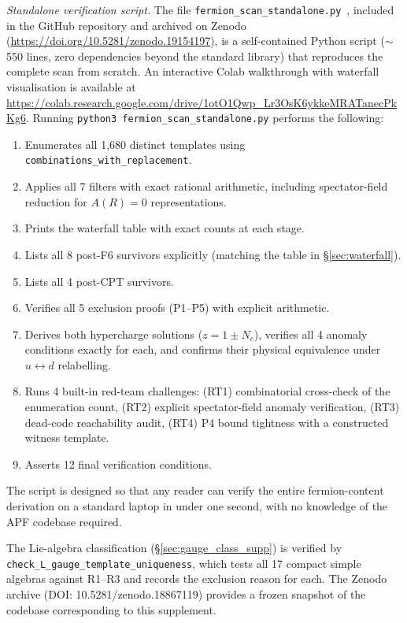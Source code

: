 \documentclass[11pt,a4paper]{article}
\theoremstyle{definition}
\begin{document}
\smallskip\noindent\textit{Standalone verification script.}\quad
The file \texttt{fermion\_scan\_standalone.py}~\cite{BrookeFermionScan},
included in the GitHub repository and archived on Zenodo
(\url{https://doi.org/10.5281/zenodo.19154197}),
is a self-contained Python script ($\sim$550 lines, zero dependencies
beyond the standard library) that reproduces the complete scan from
scratch.  An interactive Colab walkthrough with waterfall visualisation
is available at
\url{https://colab.research.google.com/drive/1otO1Qwp_Lr3OsK6ykkeMRATanecPkKg6}.
Running \texttt{python3 fermion\_scan\_standalone.py} performs the following:
\begin{enumerate}[nosep,label=(\arabic*)]
  \item Enumerates all 1{,}680 distinct templates using
  \texttt{combinations\_with\_replacement}.
  \item Applies all 7 filters with exact rational arithmetic, including
  spectator-field reduction for $A(R) = 0$ representations.
  \item Prints the waterfall table with exact counts at each stage.
  \item Lists all 8 post-F6 survivors explicitly (matching the table in
  \S\ref{sec:waterfall}).
  \item Lists all 4 post-CPT survivors.
  \item Verifies all 5 exclusion proofs (P1--P5) with explicit arithmetic.
  \item Derives both hypercharge solutions ($z = 1 \pm N_c$),
  verifies all 4 anomaly conditions exactly for each, and confirms
  their physical equivalence under $u \leftrightarrow d$ relabelling.
  \item Runs 4 built-in red-team challenges: (RT1) combinatorial
  cross-check of the enumeration count, (RT2) explicit spectator-field
  anomaly verification, (RT3) dead-code reachability audit, (RT4) P4
  bound tightness with a constructed witness template.
  \item Asserts 12 final verification conditions.
\end{enumerate}
The script is designed so that any reader can verify the entire
fermion-content derivation on a standard laptop in under one second,
with no knowledge of the APF codebase required.

The Lie-algebra classification (\S\ref{sec:gauge_class_supp}) is verified by
\texttt{check\_L\_gauge\_template\_uniqueness}, which tests all 17
compact simple algebras against R1--R3 and records the exclusion reason
for each.  The Zenodo archive
(DOI: 10.5281/zenodo.18867119) provides a frozen snapshot of the
codebase corresponding to this supplement.
\end{document}
